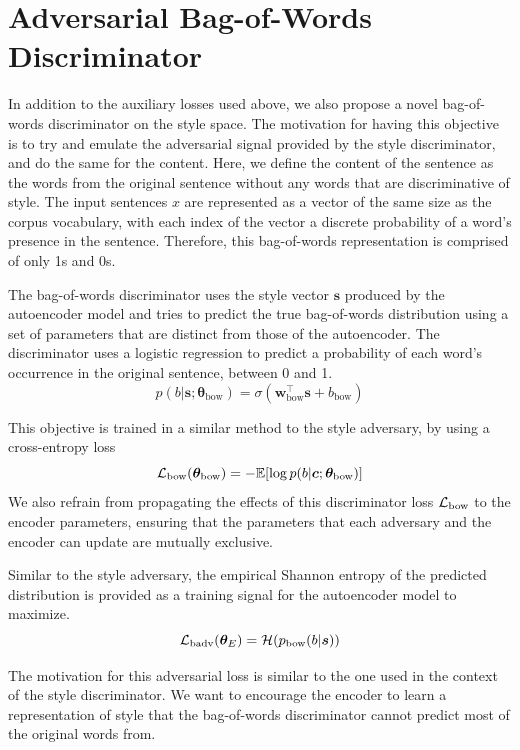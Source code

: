 \section{Adversarial Bag-of-Words Discriminator} \label{sec:adversarial-bow-objective}

In addition to the auxiliary losses used above, we also propose a novel bag-of-words discriminator on the style space. The motivation for having this objective is to try and emulate the adversarial signal provided by the style discriminator, and do the same for the content. Here, we define the content of the sentence as the words from the original sentence without any words that are discriminative of style. The input sentences $x$ are represented as a vector of the same size as the corpus vocabulary, with each index of the vector a discrete probability of a word's presence in the sentence. Therefore, this bag-of-words representation is comprised of only 1s and 0s.

The bag-of-words discriminator uses the style vector $\bm s$ produced by the autoencoder model and tries to predict the true bag-of-words distribution using a set of parameters that are distinct from those of the autoencoder. The discriminator uses a logistic regression to predict a probability of each word's occurrence in the original sentence, between 0 and 1.
\begin{equation}
	p(b | \bm s; \bm\theta_\text{bow}) = \sigma(\bm w_\text{bow}^\top \bm s + b_\text{bow})
\end{equation}

This objective is trained in a similar method to the style adversary, by using a cross-entropy loss
\begin{equation} \label{eqn:adv-bow-disc-loss}
	\mathcal{L}_\text{bow}(\bm\theta_\text{bow}) =
	- \mathbb{E} [\log p(b | \bm c; \bm\theta_\text{bow})]
\end{equation}
We also refrain from propagating the effects of this discriminator loss $\mathcal{L}_\text{bow}$ to the encoder parameters, ensuring that the parameters that each adversary and the encoder can update are mutually exclusive.

Similar to the style adversary, the empirical Shannon entropy of the predicted distribution is provided as a training signal for the autoencoder model to maximize.
\begin{equation}
	\mathcal{L}_\text{badv}(\bm\theta_E) = \mathcal{H}(p_\text{bow}(b | \bm s))
\end{equation}

The motivation for this adversarial loss is similar to the one used in the context of the style discriminator. We want to encourage the encoder to learn a representation of style that the bag-of-words discriminator cannot predict most of the original words from.

